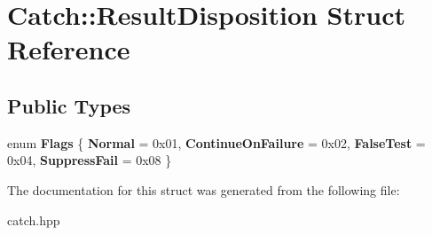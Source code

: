 \hypertarget{structCatch_1_1ResultDisposition}{}\section{Catch\+:\+:Result\+Disposition Struct Reference}
\label{structCatch_1_1ResultDisposition}
\subsection*{Public Types}
\begin{DoxyCompactItemize}
\item 
enum {\bfseries Flags} \{ {\bfseries Normal} = 0x01, 
{\bfseries Continue\+On\+Failure} = 0x02, 
{\bfseries False\+Test} = 0x04, 
{\bfseries Suppress\+Fail} = 0x08
 \}\hypertarget{structCatch_1_1ResultDisposition_a3396cad6e2259af326b3aae93e23e9d8}{}\label{structCatch_1_1ResultDisposition_a3396cad6e2259af326b3aae93e23e9d8}

\end{DoxyCompactItemize}


The documentation for this struct was generated from the following file\+:\begin{DoxyCompactItemize}
\item 
catch.\+hpp\end{DoxyCompactItemize}
